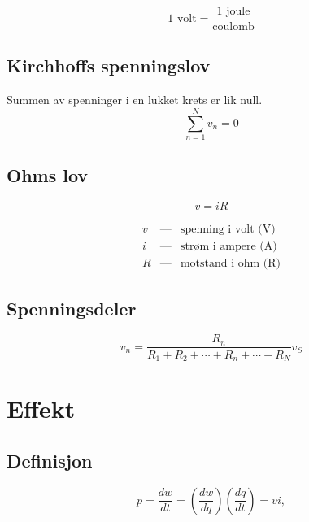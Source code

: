 \documentclass[norsk, a4paper, 12pt, twoside, titlepage]{article}
\begin{document}
\bigskip

\begin{equation}
1 \mbox{ volt} = \frac{\mbox{1 joule}}{\mbox{coulomb}}
\end{equation}

\subsection{Kirchhoffs spenningslov}
Summen av spenninger i en lukket krets er lik null.
\begin{equation}
\sum_{n=1}^{N}v_{n} = 0
\end{equation}


\subsection{Ohms lov}
\begin{equation}
v = iR
\end{equation}

\begin{eqnarray*}
v & \mbox{---} & \mbox{spenning i volt (V)} \\
i & \mbox{---} & \mbox{strøm i ampere (A)} \\
R & \mbox{---} & \mbox{motstand i ohm (R)}
\end{eqnarray*}

\subsection{Spenningsdeler}
\begin{equation}
v_{n} = \frac{R_{n}}{R_{1} + R_{2} + \cdots + R_{n} + \cdots + R_{N}} v_{S}
\end{equation}




\newpage
\section{Effekt}
\subsection{Definisjon}

\begin{equation}
p = \frac{dw}{dt} = \left(\frac{dw}{dq}\right) \left(\frac{dq}{dt}\right) = vi,
\end{equation}
\end{document}
